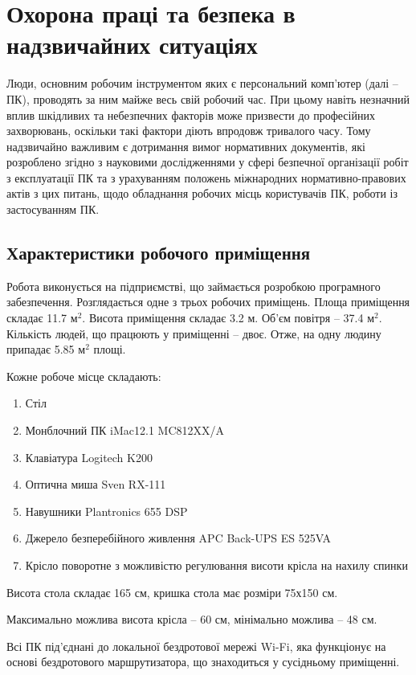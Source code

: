 \documentclass[a4paper,12pt]{article}
\begin{document}
\newpage
\section{Охорона праці та безпека в надзвичайних ситуаціях}

Люди, основним робочим інструментом яких є персональний комп’ютер (далі -- ПК), проводять за ним майже весь свій робочий час. При цьому навіть незначний вплив шкідливих та небезпечних факторів може призвести до професійних захворювань, оскільки такі фактори діють впродовж тривалого часу. Тому надзвичайно важливим є дотримання вимог нормативних документів, які розроблено згідно з  науковими дослідженнями у сфері безпечної організації робіт з експлуатації ПК та з урахуванням положень міжнародних нормативно-правових актів з цих питань, щодо обладнання робочих місць користувачів ПК, роботи із застосуванням ПК.

\subsection{Характеристики робочого приміщення}
Робота виконується на підприємстві, що займається розробкою програмного забезпечення. Розглядається одне з трьох робочих приміщень. Площа приміщення складає 11.7 $\text{м}^2$. Висота приміщення складає 3.2 м. Об’єм повітря -- 37.4 $\text{м}^2$. Кількість людей, що працюють у приміщенні -- двоє. Отже, на одну людину припадає 5.85 $\text{м}^2$ площі.

Кожне робоче місце складають:
\begin{enumerate}
\item Стіл
\item Монблочний ПК iMac12.1 MC812XX/A
\item Клавіатура Logitech K200
\item Оптична миша Sven RX-111
\item Навушники Plantronics 655 DSP
\item Джерело безперебійного живлення APC Back-UPS ES 525VA
\item Крісло поворотне з можливістю регулювання висоти крісла на нахилу спинки
\end{enumerate}

Висота стола складає 165 см, кришка стола має розміри 75х150 см.

Максимально можлива висота крісла -- 60 см, мінімально можлива -- 48 см.

Всі ПК під’єднані до локальної бездротової мережі Wi-Fi, яка функціонує на основі бездротового маршрутизатора, що знаходиться у сусідньому приміщенні.
\end{document}

